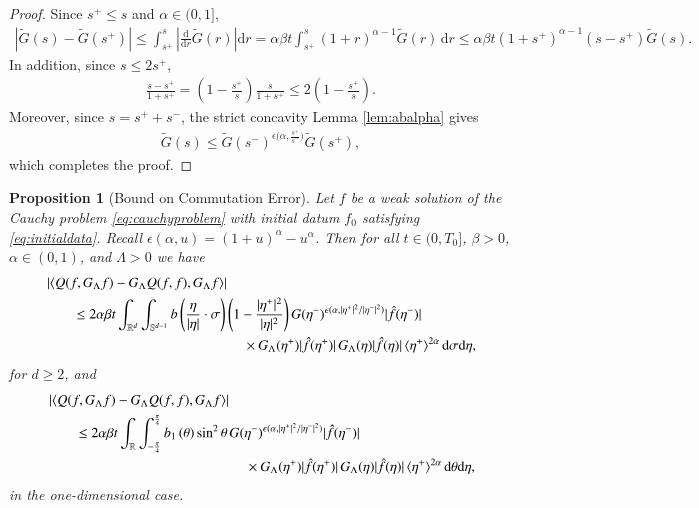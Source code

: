 \documentclass[11pt,a4paper,reqno]{amsart}
\theoremstyle{plain}
\newtheorem{proposition}{Proposition}[section]
\theoremstyle{definition}
\begin{document}
\begin{proof}
Since $s^+ \leq s$ and $\alpha \in (0,1]$,
\begin{align*}
	|\widetilde{G}(s) - \widetilde{G}(s^+)| \leq \int_{s^+}^s \left| \frac{\mathrm{d}}{\mathrm{d}r}\widetilde{G}(r) \right| \mathrm{d}r =\alpha \beta t \int_{s^+}^s  (1+r)^{\alpha-1} \widetilde{G}(r) \, \mathrm{d}r \leq \alpha \beta t  (1+s^+)^{\alpha-1} (s-s^+) \widetilde{G}(s).
\end{align*}	
In addition, since $s\leq 2s^+$,
\begin{align*}
\frac{s-s^+}{1+s^+} = \left(1-\frac{s^+}{s}\right) \frac{s}{1+s^+} \leq 2 \left(1-\frac{s^+}{s}\right).
\end{align*}
Moreover, since $s=s^+ + s^-$, the strict concavity Lemma \ref{lem:abalpha} gives
\begin{align*}
	\widetilde{G}(s) \leq \widetilde{G}(s^-)^{\epsilon\big(\alpha,\tfrac{s^+}{s^-}\big)} \widetilde{G}(s^+),
\end{align*}
which completes the proof.
\end{proof}

\begin{proposition}[Bound on Commutation Error]\label{prop:ce}
	Let $f$ be a weak solution of the Cauchy problem \eqref{eq:cauchyproblem} with initial datum $f_0$ satisfying \eqref{eq:initialdata}. Recall $\epsilon(\alpha,u) = (1+u)^{\alpha}-u^\alpha$. Then for all $t\in(0, T_0]$, $\beta>0$, $\alpha\in(0,1)$, and $\Lambda>0$ we have
	\begin{align}\label{eq:ce}
	\begin{split}
		&\left| \left\langle Q(f, G_{\Lambda}f) - G_{\Lambda} Q(f,f), G_{\Lambda}f\right\rangle\right| \\
		&\qquad \leq 2 \alpha \beta t \int_{{\mathbb{R}}^d} \int_{{\mathbb{S}}^{d-1}} b\left(\frac{\eta}{|\eta|}\cdot \sigma \right) \left(1- \frac{|\eta^+|^2}{|\eta|^2}\right) G(\eta^-)^{\epsilon(\alpha, |\eta^+|^2/ |\eta^-|^2)} |\hat{f}(\eta^-)| \\
		&\hskip5cm \times G_{\Lambda}(\eta^+) |\hat{f}(\eta^+)|\, G_{\Lambda}(\eta)|\hat{f}(\eta)| \, \langle \eta^+ \rangle^{2\alpha} \,  \mathrm{d}\sigma \mathrm{d}\eta,
		\end{split}
	\end{align}
for $d\geq 2$, and
	\begin{align}\label{eq:ce-kac}
	\begin{split}
		&\left| \left\langle Q(f, G_{\Lambda}f) - G_{\Lambda} Q(f,f), G_{\Lambda}f\right\rangle\right| \\
		&\qquad \leq 2 \alpha \beta t \int_{\mathbb{R}} \int_{-\frac{\pi}{4}}^{\frac{\pi}{4}} b_1\left(\theta\right) \sin^2\theta \, G(\eta^-)^{\epsilon(\alpha,|\eta^+|^2/ | \eta^- |^2)} |\hat{f}(\eta^-)| \\
		&\hskip5cm \times G_{\Lambda}(\eta^+) |\hat{f}(\eta^+)|\, G_{\Lambda}(\eta)|\hat{f}(\eta)| \, \langle \eta^+ \rangle^{2\alpha} \,  \mathrm{d}\theta \mathrm{d}\eta,
		\end{split}
	\end{align}
in the one-dimensional case.
\end{proposition}
\end{document}
